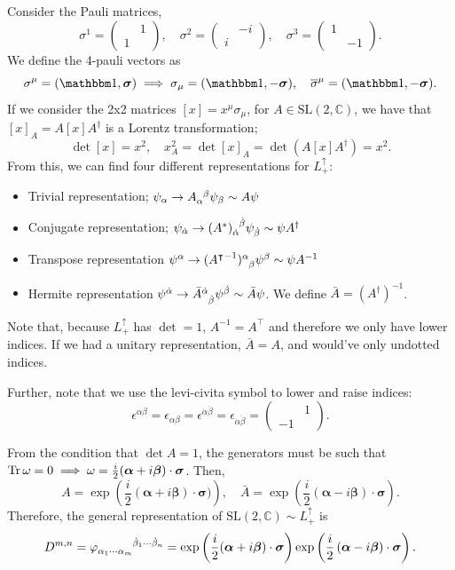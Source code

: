 \documentclass{article}
\begin{document}
Consider the Pauli matrices,
$$\sigma^1=\begin{pmatrix}&1\\1&\end{pmatrix},\quad\sigma^2=\begin{pmatrix}&-i\\i&\end{pmatrix},\quad\sigma^3=\begin{pmatrix}1&\\&-1\end{pmatrix}.$$
We define the 4-pauli vectors as 
$$\sigma^\mu=(\mathbbm 1,\boldsymbol\sigma)\implies\sigma_\mu=(\mathbbm 1,-\boldsymbol\sigma),\quad\overline\sigma^\mu=(\mathbbm 1,-\boldsymbol\sigma).$$
If we consider the 2x2 matrices $[x]=x^\mu\sigma_\mu$, for $A\in\mathrm{SL}(2,\mathbb C)$, we have that $[x]_A=A[x]A^\dag$ is a Lorentz transformation; 
$$\det[x]=x^2,\quad x^2_A=\det[x]_A=\det(A[x]A^\dag)=x^2.$$
From this, we can find four different representations for $L^\uparrow_+$:
\begin{itemize}
    \item Trivial representation; $\psi_\alpha\to A\indices{_\alpha^\beta}\psi_\beta\sim A\psi$
    \item Conjugate representation; $\psi_{\dot\alpha}\to(A^*)\indices{_{\dot\alpha}^{\dot\beta}}\psi_{\dot\beta}\sim \psi A^\dag$
    \item Transpose representation $\psi^\alpha\to ({A^\intercal}^{-1})\indices{^\alpha_\beta}\psi^\beta\sim\psi A^{-1}$
    \item Hermite representation $\psi^{\dot\alpha}\to\bar A\indices{^{\dot\alpha}_{\dot\beta}}\psi^{\dot\beta}\sim\bar A\psi$. We define $\bar A=(A^\dag)^{-1}$.
\end{itemize}
Note that, because $L^\uparrow_+$ has $\det=1$, $A^{-1}=A^\intercal$ and therefore we only have lower indices. If we had a unitary representation, $\bar A=A$, and would've only undotted indices.

Further, note that we use the levi-civita symbol to lower and raise indices:
$$\epsilon^{\alpha\beta}=\epsilon_{\alpha\beta}=\epsilon^{\dot\alpha\dot\beta}=\epsilon_{\dot\alpha\dot\beta}=\begin{pmatrix}&1\\-1&\end{pmatrix}.$$

From the condition that $\det A=1$, the generators must be such that $\Tr \omega=0\implies\omega=\frac i2(\boldsymbol\alpha+i\boldsymbol\beta)\cdot\boldsymbol\sigma$. Then, 
$$A=\exp\left(\frac i2(\boldsymbol\alpha+i\boldsymbol\beta)\cdot\boldsymbol\sigma)\right),\quad\bar A=\exp\left(\frac i2\left(\boldsymbol\alpha-i\boldsymbol\beta\right)\cdot\boldsymbol\sigma\right).$$
Therefore, the general representation of $\mathrm{SL}(2,\mathbb C)\sim L^\uparrow_+$ is 
$$D^{m,n}=\varphi\indices{_{\alpha_1\cdots\alpha_m}^{\dot\beta_1\cdots\dot\beta_n}}=\exp\left(\frac i2(\boldsymbol\alpha+i\boldsymbol\beta)\cdot\boldsymbol\sigma\right)\exp\left(\frac i2\left(\boldsymbol\alpha-i\boldsymbol\beta\right)\cdot\boldsymbol\sigma\right).$$
\end{document}
